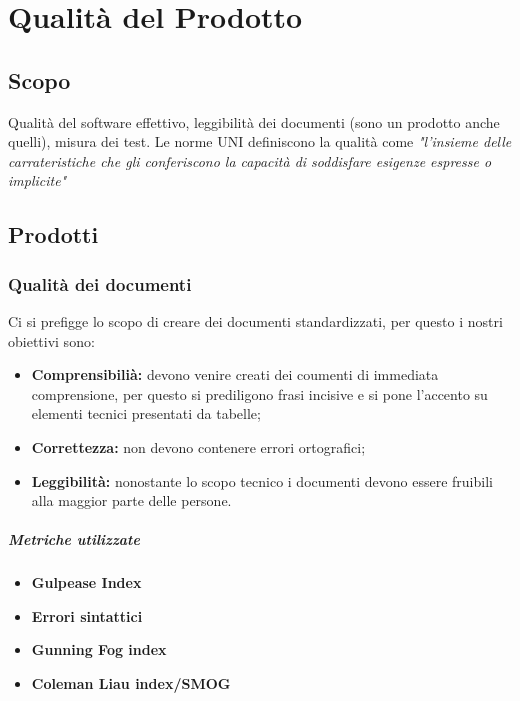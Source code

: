 \section{Qualità del Prodotto}
\subsection{Scopo}
Qualità del software effettivo, leggibilità dei documenti (sono un prodotto anche quelli), misura dei test.
Le norme UNI definiscono la qualità come \textit{"l'insieme delle carrateristiche che gli conferiscono la capacità di soddisfare esigenze espresse o implicite"}
\subsection{Prodotti}
\subsubsection{Qualità dei documenti}
Ci si prefigge lo scopo di creare dei documenti standardizzati, per questo i nostri obiettivi sono:
\begin{itemize}
	\item{\textbf{Comprensibilià:} devono venire creati dei coumenti di immediata comprensione, per questo si prediligono frasi incisive e si pone l'accento su elementi tecnici presentati da tabelle;}
	\item{\textbf{Correttezza:} non devono contenere errori ortografici;}
	\item{\textbf{Leggibilità:} nonostante lo scopo tecnico i documenti devono essere fruibili alla maggior parte delle persone.}
\end{itemize}
\vspace{0.8cm}
\subparagraph{Metriche utilizzate}
\begin{itemize}
	\item{\textbf{Gulpease Index}}
	\item{\textbf{Errori sintattici}}
	\item{\textbf{Gunning Fog index}}
	\item{\textbf{Coleman Liau index/SMOG}}
\end{itemize}
